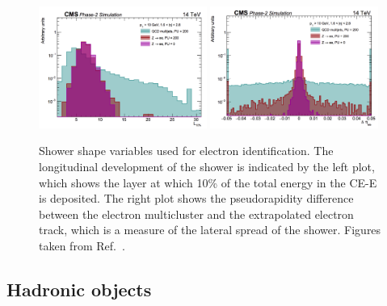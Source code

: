 \begin{figure}[h!]
  \centering
  \includegraphics[width=0.49\textwidth]{Figures/HGCAL/electronIDlon.png}
  \includegraphics[width=0.49\textwidth]{Figures/HGCAL/electronIDlat.png}
  \caption[Distributions of electron shower shape variables.]
  {
    Shower shape variables used for electron identification.
    The longitudinal development of the shower is indicated by the left plot, 
    which shows the layer at which 10\% of the total energy in the CE-E is deposited.
    The right plot shows the pseudorapidity difference between the electron multicluster
    and the extrapolated electron track, which is a measure of the lateral spread of the shower.
    Figures taken from Ref.~\cite{HGCAL}.
  }
  \label{fig:hgcal_electronID}
\end{figure}

\subsection{Hadronic objects}


